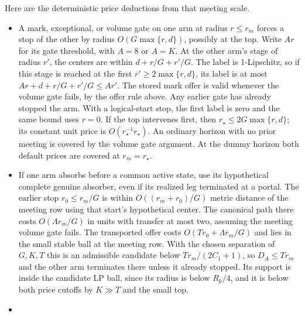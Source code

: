 \documentclass[11pt]{article}
\providecommand{\tightlist}{\setlength{\itemsep}{0pt}\setlength{\parskip}{0pt}}
\begin{document}
Here are the deterministic price deductions from that meeting scale.

\begin{itemize}
\tightlist
\item
  A mark, exceptional, or volume gate on one arm at radius \(r\le r_m\) forces a stop of the other by radius \(O(G\max\{r,d\})\), possibly at the top. Write \(Ar\) for its gate threshold, with \(A=8\) or \(A=K\). At the other arm's stage of radius \(r'\), the centers are within \(d+r/G+r'/G\). The label is 1-Lipschitz, so if this stage is reached at the first \(r'\ge 2\max\{r,d\}\), its label is at most \(Ar+d+r/G+r'/G\le Ar'\). The stored mark offer is valid whenever the volume gate fails, by the offer rule above. Any earlier gate has already stopped the arm. With a logical-start stop, the first label is zero and the same bound uses \(r=0\). If the top intervenes first, then \(r_\star\le 2G\max\{r,d\}\); its constant unit price is \(O(r_\star^{-1}r_\star)\). An ordinary horizon with no prior meeting is covered by the volume gate argument. At the dummy horizon both default prices are covered at \(r_m=r_\star\).
\item
  If one arm absorbs before a common active state, use its hypothetical complete genuine absorber, even if its realized leg terminated at a portal. The earlier stop \(r_0\le r_m/G\) is within \(O((r_m+r_0)/G)\) metric distance of the meeting row using that start's hypothetical center. The canonical path there costs \(O(\Lambda r_m/G)\) in units with transfer at most two, assuming the meeting volume gate fails. The transported offer costs \(O(T r_0+\Lambda r_m/G)\) and lies in the small stable ball at the meeting row. With the chosen separation of \(G,K,T\) this is an admissible candidate below \(T r_m/(2C_1+1)\), so \(D_A\le T r_m\) and the other arm terminates there unless it already stopped. Its support is inside the candidate LP ball, since its radius is below \(R_k/4\), and it is below both price cutoffs by \(K\gg T\) and the small top.
\item

\end{itemize}
\end{document}
